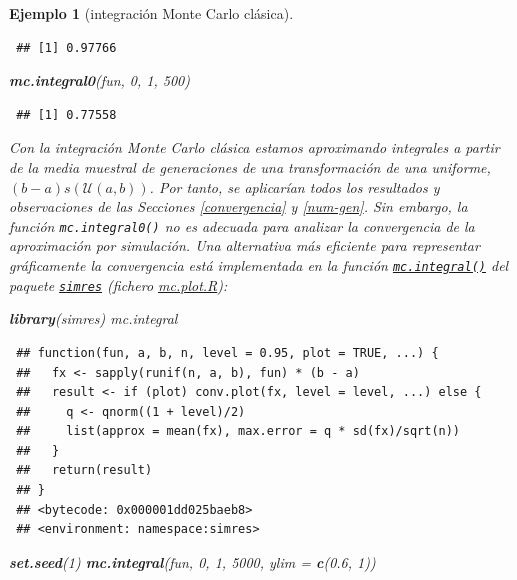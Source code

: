 \documentclass[
  spanish,
  10pt,
]{book}
\newenvironment{Shaded}{\begin{snugshade}}{\end{snugshade}}
\newcommand{\AttributeTok}[1]{\textcolor[rgb]{0.13,0.29,0.53}{#1}}
\newcommand{\DecValTok}[1]{\textcolor[rgb]{0.00,0.00,0.81}{#1}}
\newcommand{\FloatTok}[1]{\textcolor[rgb]{0.00,0.00,0.81}{#1}}
\newcommand{\FunctionTok}[1]{\textcolor[rgb]{0.13,0.29,0.53}{\textbf{#1}}}
\newcommand{\NormalTok}[1]{#1}
\theoremstyle{break}
\newtheorem{example}{Ejemplo}[chapter]
\theoremstyle{nonumberplain}
\begin{document}
\begin{example}[integración Monte Carlo clásica]
\begin{verbatim}
 ## [1] 0.97766
\end{verbatim}

\begin{Shaded}
\begin{Highlighting}[]
\FunctionTok{mc.integral0}\NormalTok{(fun, }\DecValTok{0}\NormalTok{, }\DecValTok{1}\NormalTok{, }\DecValTok{500}\NormalTok{)}
\end{Highlighting}
\end{Shaded}

\begin{verbatim}
 ## [1] 0.77558
\end{verbatim}

Con la integración Monte Carlo clásica estamos aproximando integrales a partir de la media muestral de generaciones de una transformación de una uniforme, \((b-a) s\left( \mathcal{U}(a, b) \right)\).
Por tanto, se aplicarían todos los resultados y observaciones de las Secciones \ref{convergencia} y \ref{num-gen}.
Sin embargo, la función \texttt{mc.integral0()} no es adecuada para analizar la convergencia de la aproximación por simulación.
Una alternativa más eficiente para representar gráficamente la convergencia está implementada en la función \href{https://rubenfcasal.github.io/simres/reference/mc.integral.html}{\texttt{mc.integral()}} del paquete \href{https://rubenfcasal.github.io/simres}{\texttt{simres}} (fichero \href{R/mc.plot.R}{\emph{mc.plot.R}}):

\begin{Shaded}
\begin{Highlighting}[]
\FunctionTok{library}\NormalTok{(simres)}
\NormalTok{mc.integral}
\end{Highlighting}
\end{Shaded}

\begin{verbatim}
 ## function(fun, a, b, n, level = 0.95, plot = TRUE, ...) {
 ##   fx <- sapply(runif(n, a, b), fun) * (b - a)
 ##   result <- if (plot) conv.plot(fx, level = level, ...) else {
 ##     q <- qnorm((1 + level)/2)
 ##     list(approx = mean(fx), max.error = q * sd(fx)/sqrt(n))
 ##   }
 ##   return(result)
 ## }
 ## <bytecode: 0x000001dd025baeb8>
 ## <environment: namespace:simres>
\end{verbatim}

\begin{Shaded}
\begin{Highlighting}[]
\FunctionTok{set.seed}\NormalTok{(}\DecValTok{1}\NormalTok{)}
\FunctionTok{mc.integral}\NormalTok{(fun, }\DecValTok{0}\NormalTok{, }\DecValTok{1}\NormalTok{, }\DecValTok{5000}\NormalTok{, }\AttributeTok{ylim =} \FunctionTok{c}\NormalTok{(}\FloatTok{0.6}\NormalTok{, }\DecValTok{1}\NormalTok{))}
\end{Highlighting}
\end{Shaded}


\end{example}
\end{document}
